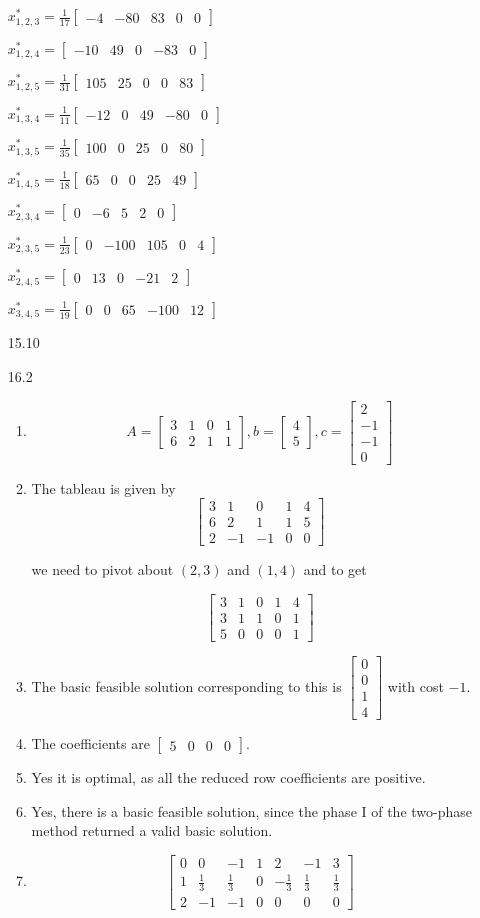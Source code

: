 \documentclass[10pt,a4paper]{article}
\newcommand\m[1]{\begin{bmatrix}#1\end{bmatrix}}
\begin{document}
\begin{enumerate}
        $ x^*_{1, 2, 3} = \frac{1}{17}\m{-4 & -80 & 83 & 0 & 0 }$

        $ x^*_{1, 2, 4} = \m{-10 & 49 & 0 & -83 & 0 }$

        $ x^*_{1, 2, 5} = \frac{1}{31}\m{105 & 25 & 0 & 0 & 83 }$

        $ x^*_{1, 3, 4} = \frac{1}{11}\m{-12 & 0 & 49 & -80 & 0 }$

        $ x^*_{1, 3, 5} = \frac{1}{35}\m{100 & 0 & 25 & 0 & 80 }$

        $ x^*_{1, 4, 5} = \frac{1}{18}\m{65 & 0 & 0 & 25 & 49 }$

        $ x^*_{2, 3, 4} = \m{0 & -6 & 5 & 2 & 0 }$

        $ x^*_{2, 3, 5} = \frac{1}{23}\m{0 & -100 & 105 & 0 & 4 }$

        $ x^*_{2, 4, 5} = \m{0 & 13 & 0 & -21 & 2 }$

        $ x^*_{3, 4, 5} = \frac{1}{19}\m{0 & 0 & 65 & -100 & 12 }$


    \item [15.10]
    \vspace{20mm}
    
    \item [16.2] \begin{enumerate}
        \item $$A= \m{3 & 1 & 0 &1  \\ 6 &2 &1&1}, b = \m{4 \\5}, c = \m{2 \\-1 \\-1 \\0 }$$
        \item The tableau is given by 
        $$ \m{ 3 & 1 & 0 & 1 & 4\\ 6 & 2 &1 & 1 & 5 \\ 2 & -1 & -1 &0 &0}$$

        we need to pivot about $(2, 3)$ and $(1, 4)$ and to get 

        $$ \m{ 3 & 1 & 0 & 1 & 4\\ 3 & 1 &1 & 0 & 1 \\ 5 & 0 & 0 &0 &1}$$

        \item  The basic feasible solution corresponding to this is $\m{0 \\ 0 \\ 1 \\ 4}$ with cost $-1$.
        \item The coefficients are $\m{5 & 0 & 0 & 0 }$.
        \item Yes it is optimal, as all the reduced row coefficients are positive.
        \item Yes, there is a basic feasible solution, since the phase I of the two-phase method returned a valid basic solution.
        \item $$\m{0 & 0 & -1 & 1 & 2 & -1 & 3 \\ 1 & \frac{1}{3} & \frac{1}{3} & 0 & -\frac{1}{3} & \frac{1}{3} & \frac{1}{3} \\ 2 & -1 & -1 & 0 & 0 &0 &0  }$$



\end{enumerate}
\end{enumerate}
\end{document}
